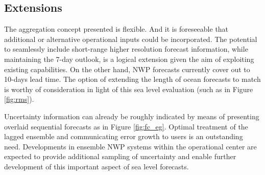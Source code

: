 \documentclass[jmse,article,accept,moreauthors,pdftex,10pt,a4paper]{mdpi}
\begin{document}
\subsection{Extensions}
The aggregation concept presented is flexible.
And it is foreseeable that additional or alternative operational inputs could be incorporated. 
The potential to seamlessly include short-range higher resolution forecast information, while maintaining the 7-day outlook, is a logical extension given the aim of exploiting existing capabilities.
On the other hand, NWP forecasts currently cover out to 10-days lead time. The option of extending the length of ocean forecasts to match is worthy of consideration in light of this sea level evaluation (such as in Figure \ref{fig:rms}).

Uncertainty information can already be roughly indicated by means of presenting overlaid sequential forecasts as in Figure \ref{fig:fc_eg}.
Optimal treatment of the lagged ensemble and communicating error growth to users is an outstanding need.
Developments in ensemble NWP systems within the operational center are expected to provide additional sampling of uncertainty and enable further development of this important aspect of sea level forecasts.  




\end{document}
